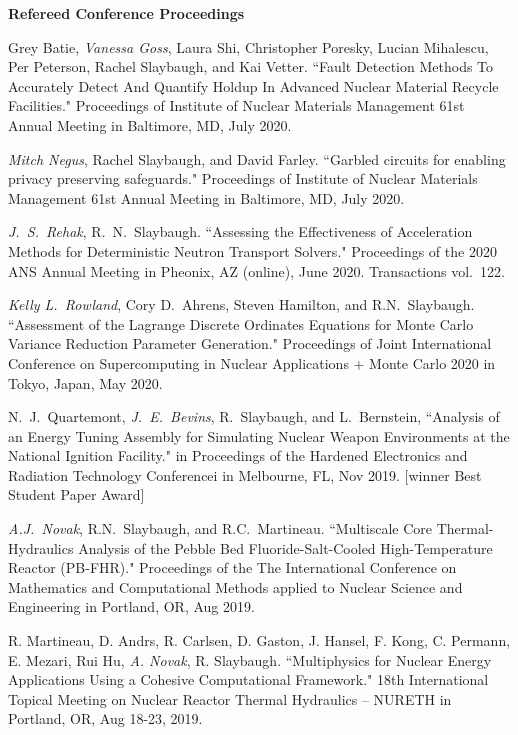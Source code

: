 \begin{bibsection}
\item \textbf{Refereed Conference Proceedings}
\item Grey Batie, \textit{Vanessa Goss}, Laura Shi, Christopher Poresky, Lucian
Mihalescu, Per Peterson, Rachel Slaybaugh, and Kai Vetter. ``Fault Detection Methods To Accurately Detect And Quantify Holdup In Advanced Nuclear Material Recycle Facilities."  Proceedings of Institute
of Nuclear Materials Management 61st Annual Meeting in Baltimore, MD, July 2020.

\item \textit{Mitch Negus}, Rachel Slaybaugh, and David Farley. ``Garbled
circuits for enabling privacy preserving safeguards." Proceedings of Institute
of Nuclear Materials Management 61st Annual Meeting in Baltimore, MD, July 2020.

\item \textit{J.\ S.\ Rehak}, R.\ N.\ Slaybaugh. ``Assessing the Effectiveness
of Acceleration Methods for Deterministic Neutron Transport Solvers."
Proceedings of  the 2020 ANS Annual Meeting in Pheonix, AZ (online), June 2020.
Transactions vol.\ 122.

\item \textit{Kelly L.\ Rowland}, Cory D.\ Ahrens, Steven Hamilton, and R.N.\
Slaybaugh. ``Assessment of the Lagrange Discrete Ordinates Equations for Monte
Carlo Variance Reduction Parameter Generation." Proceedings of Joint
International Conference on Supercomputing in Nuclear Applications + Monte Carlo
2020 in Tokyo, Japan, May 2020. 

\item N.\ J.\ Quartemont, \textit{J.\ E.\ Bevins}, R.\ Slaybaugh, and L.\ Bernstein, ``Analysis
of an Energy Tuning Assembly for Simulating Nuclear Weapon Environments at the
National Ignition Facility." in Proceedings of the Hardened Electronics and
Radiation Technology Conferencei in Melbourne, FL, Nov 2019. [winner Best Student Paper Award]

\item \textit{A.J.\ Novak}, R.N.\ Slaybaugh, and R.C.\ Martineau. ``Multiscale
Core Thermal-Hydraulics Analysis of the Pebble Bed Fluoride-Salt-Cooled
High-Temperature Reactor (PB-FHR)." Proceedings of the The International
Conference on Mathematics and Computational Methods applied to Nuclear Science
and Engineering in Portland, OR, Aug 2019. 

\item R. Martineau, D. Andrs, R. Carlsen, D. Gaston, J. Hansel, F. Kong, C. Permann, E. Mezari, Rui Hu, \textit{A. Novak}, R. Slaybaugh. ``Multiphysics for Nuclear Energy Applications Using a Cohesive Computational Framework." 18th International Topical Meeting on Nuclear Reactor Thermal Hydraulics – NURETH in Portland, OR, Aug 18-23, 2019. 


\end{bibsection}
